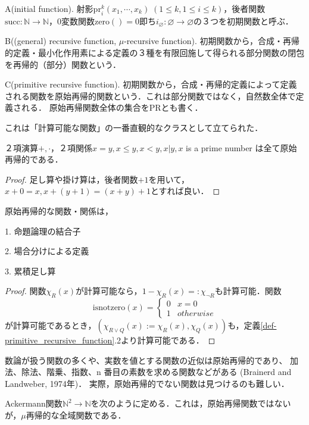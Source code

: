 \documentclass[uplatex, dvipdfmx]{jsreport}
\begin{document}
\begin{definition}
    A(initial function). 射影$\mathrm{pr}^k_i(x_1,\cdots,x_k)\;(1\le k, 1\le i\le k)$，後者関数$\mathrm{succ}:\mathbb{N}\to\mathbb{N}$，0変数関数$\mathrm{zero}()=0$即ち$i_\varnothing:\varnothing\to\varnothing$の３つを初期関数と呼ぶ．

    B((general) recursive function, $\mu$-recursive function). 初期関数から，合成・再帰的定義・最小化作用素による定義の３種を有限回施して得られる部分関数の閉包を再帰的（部分）関数という．

    C(primitive recursive function). 初期関数から，合成・再帰的定義によって定義される関数を原始再帰的関数という．これは部分関数ではなく，自然数全体で定義される．
    原始再帰関数全体の集合をPRとも書く．\rightline{$\blacksquare$}
\end{definition}
これは「計算可能な関数」の一番直観的なクラスとして立てられた．

\begin{proposition}
    ２項演算$+,\cdot$，２項関係$x=y, x\le y, x<y, x|y, x$ is a prime number は全て原始再帰的である．
\end{proposition}
\begin{proof}
    足し算や掛け算は，後者関数$+1$を用いて，$x+0=x, x+(y+1)=(x+y)+1$とすれば良い．
\end{proof}
\begin{proposition}
    原始再帰的な関数・関係は，

    1. 命題論理の結合子
    
    2. 場合分けによる定義

    3. 累積足し算
\end{proposition}
\begin{proof}
    関数$\chi_R(x)$が計算可能なら，$1-\chi_R(x)=:\chi_{\lnot R}$も計算可能．関数
    \[ \mathrm{isnotzero}(x)=\begin{cases}
        0 & x=0 \\
        1 & otherwise
    \end{cases} \]が計算可能であるとき，$(\chi_{R\lor Q}(x):=\chi_R(x),\chi_Q(x))$も，定義\ref{def-primitive_recursive_function}.2より計算可能である．
\end{proof}

数論が扱う関数の多くや、実数を値とする関数の近似は原始再帰的であり、
加法、除法、階乗、指数、n 番目の素数を求める関数などがある (Brainerd and Landweber, 1974年)．
実際，原始再帰的でない関数は見つけるのも難しい．

\begin{proposition}
    Ackermann関数$\mathbb{N}^2\to\mathbb{N}$を次のように定める．これは，原始再帰関数ではないが，$\mu$再帰的な全域関数である．
\end{proposition}
\end{document}
